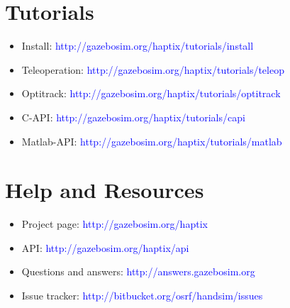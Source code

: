 \documentclass[11pt, letterpaper, landscape]{article}
\begin{document}
\begin{figure}[!htb]
  \centering
  \begin{minipage}[t]{0.48\textwidth}
    \begin{tcolorbox}[height=5cm,colback=gray!8,colframe=gray!15]
      \section*{Tutorials}
      \begin{itemize}
        \item Install: \textcolor{blue}{http://gazebosim.org/haptix/tutorials/install}
        \item Teleoperation: \textcolor{blue}{http://gazebosim.org/haptix/tutorials/teleop}
        \item Optitrack: \textcolor{blue}{http://gazebosim.org/haptix/tutorials/optitrack}
        \item C-API: \textcolor{blue}{http://gazebosim.org/haptix/tutorials/capi}
        \item Matlab-API: \textcolor{blue}{http://gazebosim.org/haptix/tutorials/matlab}
      \end{itemize}
    \end{tcolorbox}
  \end{minipage}%
  \hspace{0.02\textwidth}%
  \begin{minipage}[t]{0.48\textwidth}
    \begin{tcolorbox}[height=5cm,colback=gray!8,colframe=gray!15]
      \section*{Help and Resources}
      \begin{itemize}
        \item Project page: \textcolor{blue}{http://gazebosim.org/haptix}
        \item API: \textcolor{blue}{http://gazebosim.org/haptix/api}
        \item Questions and answers: \textcolor{blue}{http://answers.gazebosim.org}
        \item Issue tracker: \textcolor{blue}{http://bitbucket.org/osrf/handsim/issues}
      \end{itemize}

    \end{tcolorbox}
  \end{minipage}
\end{figure}
\end{document}
